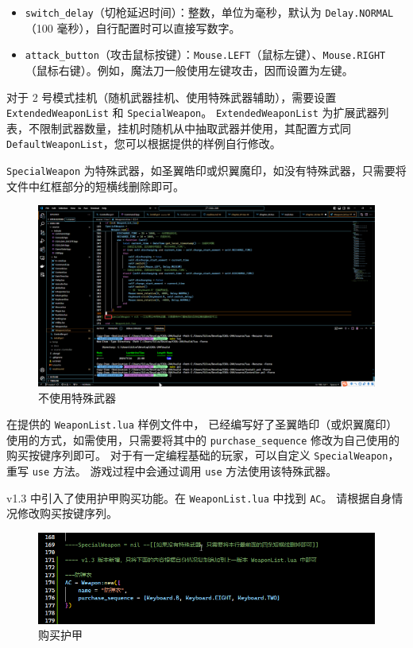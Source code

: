 \begin{itemize}
\item \lstinline{switch_delay}（切枪延迟时间）：整数，单位为毫秒，默认为 \lstinline{Delay.NORMAL}（100 毫秒），自行配置时可以直接写数字。
\item \lstinline{attack_button}（攻击鼠标按键）：\lstinline{Mouse.LEFT}（鼠标左键）、\lstinline{Mouse.RIGHT}（鼠标右键）。例如，魔法刀一般使用左键攻击，因而设置为左键。
\end{itemize}

对于 2 号模式挂机（随机武器挂机、使用特殊武器辅助），需要设置 \lstinline{ExtendedWeaponList} 和 \lstinline{SpecialWeapon}。
\lstinline{ExtendedWeaponList} 为扩展武器列表，不限制武器数量，挂机时随机从中抽取武器并使用，其配置方式同 \lstinline{DefaultWeaponList}，您可以根据提供的样例自行修改。

\lstinline{SpecialWeapon} 为特殊武器，如圣翼皓印或炽翼魔印，如没有特殊武器，只需要将文件中红框部分的短横线删除即可。

\begin{figure}
    \Centering
    \includegraphics[width=\textwidth]{docs/assets/delete_SpecialWeapon.png}
    \caption{不使用特殊武器}
\end{figure}

在提供的 \lstinline{WeaponList.lua} 样例文件中，
已经编写好了圣翼皓印（或炽翼魔印）使用的方式，如需使用，只需要将其中的 \lstinline{purchase_sequence} 修改为自己使用的购买按键序列即可。
对于有一定编程基础的玩家，可以自定义 \lstinline{SpecialWeapon}，重写 \lstinline{use} 方法。
游戏过程中会通过调用 \lstinline{use} 方法使用该特殊武器。

v1.3 中引入了使用护甲购买功能。在 \lstinline{WeaponList.lua} 中找到 \lstinline{AC}。
请根据自身情况修改购买按键序列。

\begin{figure}
    \Centering
    \includegraphics[width=\textwidth]{docs/assets/buy_ac.png}
    \caption{购买护甲}
\end{figure}

